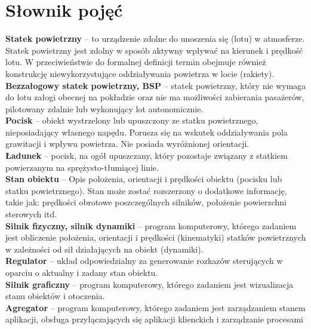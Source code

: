 \documentclass[15pt]{sprawozdanie}
\begin{document}
\newpage

\color{orange}
\section{Słownik pojęć}

\textbf{Statek powietrzny} -- to urządzenie zdolne do unoszenia się (lotu) w atmosferze. Statek powietrzny jest zdolny w sposób aktywny wpływać na kierunek i prędkość lotu. W przeciwieństwie do formalnej definicji termin obejmuje również konstrukcję niewykorzystujące oddziaływania powietrza w locie (rakiety).\\

\textbf{Bezzałogowy statek powietrzny, BSP} -- statek powietrzny, który nie wymaga do lotu załogi obecnej na pokładzie oraz nie ma możliwości zabierania pasażerów, pilotowany zdalnie lub wykonujący lot autonomicznie.\\ 

\textbf{Pocisk} -- obiekt wystrzelony lub upuszczony ze statku powietrznego, nieposiadający własnego napędu. Porusza się na wskutek oddziaływania pola grawitacji i wpływu powietrza. Nie posiada wyróżnionej orientacji.\\

\textbf{Ładunek} -- pocisk, na ogół upuszczany, który pozostaje związany z statkiem powierzanym na sprężysto-tłumiącej linie. \\

\textbf{Stan obiektu} -- Opis położenia, orientacji i prędkości obiektu (pocisku lub statku powietrznego). Stan może zostać rozszerzony o dodatkowe informację, takie jak: prędkości obrotowe poszczególnych silników, położenie powierzchni sterowych itd. \\

\textbf{Silnik fizyczny, silnik dynamiki} -- program komputerowy, którego zadaniem jest obliczenie położenia, orientacji i prędkości (kinematyki) statków powietrznych w zależności od sił działających na obiekt (dynamiki). \\

\textbf{Regulator} -- układ odpowiedzialny za generowanie rozkazów sterujących w oparciu o aktualny i zadany stan obiektu.\\

\textbf{Silnik graficzny} -- program komputerowy, którego zadaniem jest wizualizacja stanu obiektów i otoczenia.\\

\textbf{Agregator} --  program komputerowy, którego zadaniem jest zarządzaniem stanem aplikacji, obsługa przyłączających się aplikacji klienckich i zarządzanie procesami\\
\end{document}
